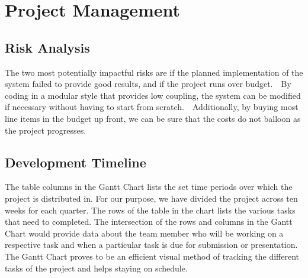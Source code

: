 \chapter{Project Management}

\section{Risk Analysis}
The two most potentially impactful risks are if the planned implementation of the system failed to provide good results, and if the project runs over budget.  By coding in a modular style that provides low coupling, the system can be modified if necessary without having to start from scratch.  Additionally, by buying most line items in the budget up front, we can be sure that the costs do not balloon as the project progresses.

\section{Development Timeline}
The table columns in the Gantt Chart lists the set time periods over which the project is distributed in. For our purpose, we have divided the project across ten weeks for each quarter. The rows of the table in the chart lists the various tasks that need to completed. The intersection of the rows and columns in the Gantt Chart would provide data about the team member who will be working on a respective task and when a particular task is due for submission or presentation.
The Gantt Chart proves to be an efficient visual method of tracking the different tasks of the project and helps staying on schedule.
